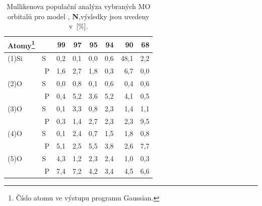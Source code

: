 \documentclass[
digital, %
table,   %
nolof,     %
nolot,     %
oneside,
]{fithesis3}
\begin{document}
\begin{table}[H]\begin{minipage}{\textwidth}
\caption{Mullikenova populační analýza vybraných MO orbitalů pro model , \textbf{N},výsledky jsou uvedeny v~[\%].}
\begin{center}
\begin{tabular}{|l|r|r|r|r|r|r|r|}
\hline
Atomy\footnote{Číslo atomu ve výstupu programu Gaussian.}  \label{si_model_orezany_MPA} &  & 99 & 97 & 95 & 94 & 90 & 68 \\ \hline
(1)Si & S~& 0,2  & 0,1  & 0,0  & 0,6  & 48,1  & 2,2  \\ \hline
& P & 1,6  & 2,7  & 1,8  & 0,3  & 6,7  & 0,0  \\ \hline
(2)O & S~& 0,0  & 0,8  & 0,1  & 0,6  & 0,4  & 0,6  \\ \hline
& P & 0,4  & 5,2  & 3,6  & 5,2  & 4,1  & 0,5  \\ \hline
(3)O & S~& 0,1  & 3,3  & 0,8  & 2,3  & 1,4  & 1,1  \\ \hline
& P & 0,3  & 1,4  & 2,7  & 2,3  & 2,3  & 9,5  \\ \hline
(4)O & S~& 0,1  & 2,4  & 0,7  & 1,5  & 1,8  & 0,8  \\ \hline
& P & 5,1  & 2,5  & 5,5  & 3,8  & 2,6  & 7,7  \\ \hline
(5)O & S~& 4,3  & 1,2  & 2,3  & 2,4  & 1,0  & 0,3  \\ \hline
& P & 7,4  & 7,2  & 4,2  & 3,4  & 4,5  & 6,6 \\ \hline
\end{tabular}
\end{center}\end{minipage}\end{table}
\end{document}

